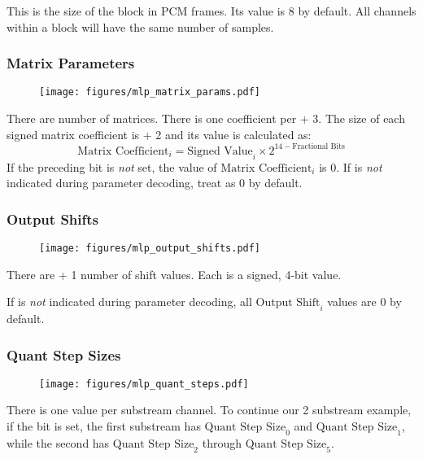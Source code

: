 This is the size of the block in PCM frames.
Its value is 8 by default.
All channels within a block will have the same number of samples.

\clearpage

\subsubsection{Matrix Parameters}


\begin{figure}[h]
\texttt{[image: figures/mlp\_matrix\_params.pdf]}
\end{figure}
\par
\noindent
There are  number of matrices.
There is one coefficient per  + 3.
The size of each signed matrix coefficient is  + 2
and its value is calculated as:
\begin{equation*}
\text{Matrix Coefficient}_i = \text{Signed Value}_i \times 2 ^ {14 - \text{Fractional Bits}}
\end{equation*}
If the preceding  bit is \textit{not} set,
the value of $\text{Matrix Coefficient}_i$ is 0.
If  is \textit{not} indicated during parameter decoding,
treat  as 0 by default.

\subsubsection{Output Shifts}


\begin{figure}[h]
\texttt{[image: figures/mlp\_output\_shifts.pdf]}
\end{figure}
\par
\noindent
There are  + 1 number of shift values.
Each is a signed, 4-bit value.
\par
If  is \textit{not} indicated during parameter
decoding, all $\text{Output Shift}_i$ values are 0 by default.


\subsubsection{Quant Step Sizes}

\begin{figure}[h]
\texttt{[image: figures/mlp\_quant\_steps.pdf]}
\end{figure}
\par
\noindent
There is one  value per substream channel.
To continue our 2 substream example, if the  bit is set,
the first substream has $\text{Quant Step Size}_0$ and
$\text{Quant Step Size}_1$,
while the second has $\text{Quant Step Size}_2$ through
$\text{Quant Step Size}_5$.

